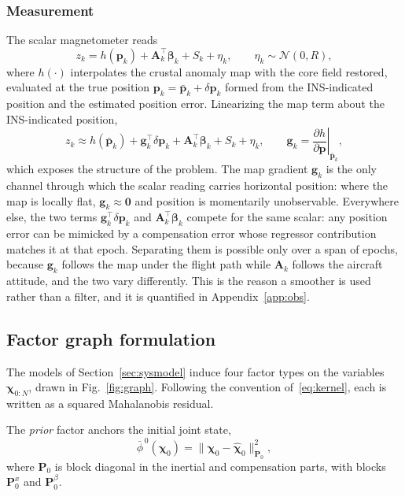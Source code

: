 \subsubsection{Measurement}
The scalar magnetometer reads
\begin{equation}
z_k=h(\mathbf{p}_k)+\mathbf{A}_k^{\top}\boldsymbol{\beta}_k+S_k+\eta_k,
\qquad \eta_k\sim\mathcal{N}(0,R),
\label{eq:meas}
\end{equation}
where $h(\cdot)$ interpolates the crustal anomaly map with the core field
restored, evaluated at the true position
$\mathbf{p}_k=\bar{\mathbf{p}}_k+\delta\mathbf{p}_k$ formed from the
INS-indicated position and the estimated position error. Linearizing the map
term about the INS-indicated position,
\begin{equation}
z_k\approx h(\bar{\mathbf{p}}_k)+\mathbf{g}_k^{\top}\delta\mathbf{p}_k
+\mathbf{A}_k^{\top}\boldsymbol{\beta}_k+S_k+\eta_k,
\qquad
\mathbf{g}_k=\left.\frac{\partial h}{\partial\mathbf{p}}\right|_{\bar{\mathbf{p}}_k},
\label{eq:measlin}
\end{equation}
which exposes the structure of the problem. The map gradient $\mathbf{g}_k$ is
the only channel through which the scalar reading carries horizontal position:
where the map is locally flat, $\mathbf{g}_k\!\approx\!\mathbf{0}$ and position
is momentarily unobservable. Everywhere else, the two terms
$\mathbf{g}_k^{\top}\delta\mathbf{p}_k$ and
$\mathbf{A}_k^{\top}\boldsymbol{\beta}_k$ compete for the same scalar: any
position error can be mimicked by a compensation error whose regressor
contribution matches it at that epoch. Separating them is possible only over a
span of epochs, because $\mathbf{g}_k$ follows the map under the flight path
while $\mathbf{A}_k$ follows the aircraft attitude, and the two vary
differently. This is the reason a smoother is used rather than a filter, and it
is quantified in Appendix~\ref{app:obs}.

\subsection{Factor graph formulation}\label{sec:graphform}
The models of Section~\ref{sec:sysmodel} induce four factor types on the
variables $\boldsymbol{\chi}_{0:N}$, drawn in Fig.~\ref{fig:graph}. Following the
convention of~\eqref{eq:kernel}, each is written as a squared Mahalanobis
residual.

The \emph{prior} factor anchors the initial joint state,
\begin{equation}
\bar{\phi}^{\,0}(\boldsymbol{\chi}_0)=
\big\lVert\boldsymbol{\chi}_0-\hat{\boldsymbol{\chi}}_0\big\rVert^{2}_{\mathbf{P}_0},
\label{eq:fprior}
\end{equation}
where $\mathbf{P}_0$ is block diagonal in the inertial and compensation parts,
with blocks $\mathbf{P}_0^{x}$ and $\mathbf{P}_0^{\beta}$.

